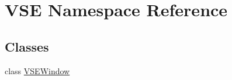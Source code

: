\hypertarget{namespace_v_s_e}{}\section{V\+SE Namespace Reference}
\label{namespace_v_s_e}
\subsection*{Classes}
\begin{DoxyCompactItemize}
\item 
class \hyperlink{class_v_s_e_1_1_v_s_e_window}{V\+S\+E\+Window}
\end{DoxyCompactItemize}
